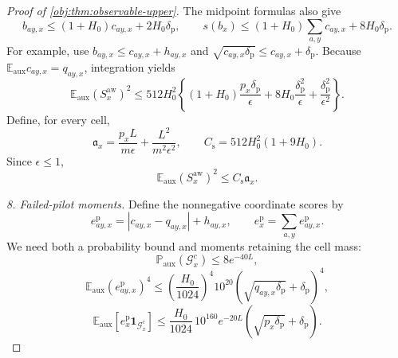 \begin{proof}[Proof of \cref{obj:thm:observable-upper}]
The midpoint formulas also give
\[
b_{ay,x}\le(1+H_0)c_{ay,x}+2H_0\delta_{\mathrm p},
\qquad
s(b_x)\le(1+H_0)\sum_{a,y}c_{ay,x}+8H_0\delta_{\mathrm p}.
\]
For example, use \(b_{ay,x}\le c_{ay,x}+h_{ay,x}\) and
\(\sqrt{c_{ay,x}\delta_{\mathrm p}}\le c_{ay,x}+\delta_{\mathrm p}\).
Because \(\mathbb E_{\mathrm{aux}}c_{ay,x}=q_{ay,x}\), integration yields
\[
\mathbb E_{\mathrm{aux}}(S_x^{\mathrm{aw}})^2
\le512H_0^2
\left\{
(1+H_0)\frac{p_x\delta_{\mathrm p}}{\epsilon}
+8H_0\frac{\delta_{\mathrm p}^2}{\epsilon}
+\frac{\delta_{\mathrm p}^2}{\epsilon^2}
\right\}.
\]
Define, for every cell,
\[
\mathfrak a_x
=
\frac{p_xL}{m\epsilon}
+\frac{L^2}{m^2\epsilon^2},
\qquad
C_{\mathrm s}=512H_0^2(1+9H_0).
\]
Since \(\epsilon\le1\),
\[
\mathbb E_{\mathrm{aux}}(S_x^{\mathrm{aw}})^2
\le C_{\mathrm s}\mathfrak a_x.
\]

\textit{8. Failed-pilot moments.}
Define the nonnegative coordinate scores by
\[
e_{ay,x}^{\mathrm p}
=
|c_{ay,x}-q_{ay,x}|+h_{ay,x},
\qquad
e_x^{\mathrm p}=\sum_{a,y}e_{ay,x}^{\mathrm p}.
\]
We need both a probability bound and moments retaining the cell mass:
\[
\mathbb P_{\mathrm{aux}}(\mathcal G_x^c)\le8e^{-40L},
\]
\[
\mathbb E_{\mathrm{aux}}(e_{ay,x}^{\mathrm p})^4
\le
\left(\frac{H_0}{1024}\right)^4
10^{20}
\left(\sqrt{q_{ay,x}\delta_{\mathrm p}}+\delta_{\mathrm p}\right)^4,
\]
\[
\mathbb E_{\mathrm{aux}}
[e_x^{\mathrm p}\mathbf1_{\mathcal G_x^c}]
\le
\frac{H_0}{1024}\,10^{160}e^{-20L}
\left(\sqrt{p_x\delta_{\mathrm p}}+\delta_{\mathrm p}\right).
\]


\end{proof}
